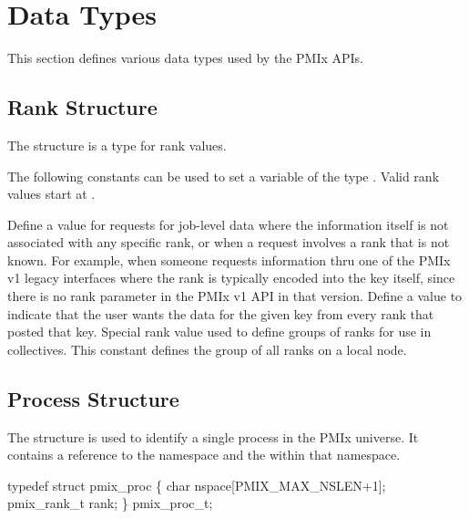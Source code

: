 \section{Data Types}

This section defines various data types used by the PMIx APIs.

\subsection{Rank Structure}

The  structure is a  type for rank values.

The following constants can be used to set a variable of the type .
Valid rank values start at .

\begin{constantdesc}
%
Define a value for requests for job-level data where the information itself is not associated with any specific rank, or when a request involves a rank that is not known.
For example, when someone requests information thru one of the PMIx v1 legacy interfaces where the rank is typically encoded into the key itself, since there is no rank parameter in the PMIx v1  API in that version.
%
Define a value to indicate that the user wants the data for the given key from every rank that posted that key.
%
Special rank value used to define groups of ranks for use in collectives.
This constant defines the group of all ranks on a local node.
%
\end{constantdesc}


\subsection{Process Structure}

The  structure is used to identify a single process in the PMIx universe.
It contains a reference to the namespace and the  within that namespace.

\cspecificstart
\begin{codepar}
typedef struct pmix_proc \{
    char nspace[PMIX_MAX_NSLEN+1];
    pmix_rank_t rank;
\} pmix_proc_t;
\end{codepar}
\cspecificend


